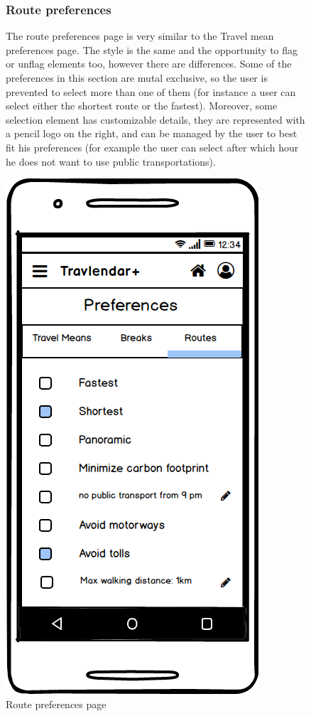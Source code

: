 		\begin{figure}
				\begin{flushleft}
				\subsubsection{Route preferences}
				The route preferences page is very similar to the Travel mean preferences page. The style is the same and the opportunity to flag or unflag elements too, however there are differences. Some of the preferences in this section are mutal exclusive, so the user is prevented to select more than one of them (for instance a user can select either the shortest route or the fastest). Moreover, some selection element has customizable details, they are represented with a pencil logo on the right, and can be managed by the user to best fit his preferences (for example the user can select after which hour he does not want to use public transportations).
			\end{flushleft}
		\centering
		\includegraphics[width=0.5\linewidth]{mockups/PreferencesRoutes}
		\caption{Route preferences page}
		\label{fig:preferencesroutes}
		
	\end{figure}
	